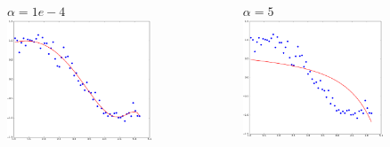 \documentclass[handout]{beamer}
\begin{document}
\begin{frame}
\begin{columns}
\vspace{-2em}
\begin{figure}
$\alpha=1e-4$
\includegraphics[width=0.99\textwidth]{./fig/L1/ridge_alpha1e-4.png}
\end{figure}
\vspace{-2em}
\begin{figure}
$\alpha=5$
\includegraphics[width=0.99\textwidth]{./fig/L1/ridge_alpha5.png}
\end{figure}
\end{columns}
\end{frame}
\end{document}
